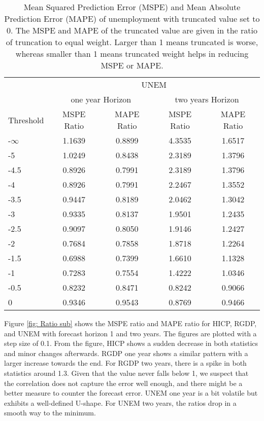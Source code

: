 \documentclass[11pt]{article}
\begin{document}
\begin{table}[!h] 
	\centering
	\caption{Mean Squared Prediction Error (MSPE) and Mean Absolute Prediction Error (MAPE) of unemployment with  truncated value set to 0. The MSPE and MAPE of the truncated value are given in the ratio of truncation to equal weight. Larger than 1 means truncated is worse, whereas smaller than 1 means truncated weight helps in reducing MSPE or MAPE.}
	\label{tab: MSPE UNEM}
	\begin{tabular}{lcccc}
		\hline\hline
		& \multicolumn{4}{c}{UNEM}                                                \\
		\cmidrule(lr){2-5}
		& \multicolumn{2}{c}{one year Horizon} & \multicolumn{2}{c}{two years Horizon} \\
		\cmidrule(lr){2-3} \cmidrule(lr){4-5}
		Threshold & MSPE Ratio &    MAPE Ratio    & MSPE Ratio &    MAPE Ratio    \\ 
		\hline
		-$\infty$ & 1.1639 & 0.8899 & 4.3535 & 1.6517\\ 
		-5 & 1.0249 & 0.8438 & 2.3189 & 1.3796\\ 
		-4.5 & 0.8926 & 0.7991 & 2.3189 & 1.3796\\ 
		-4 & 0.8926 & 0.7991 & 2.2467 & 1.3552\\ 
		-3.5 & 0.9447 & 0.8189 & 2.0462 & 1.3042\\ 
		-3 & 0.9335 & 0.8137 & 1.9501 & 1.2435\\ 
		-2.5 & 0.9097 & 0.8050 & 1.9146 & 1.2427\\ 
		-2 & 0.7684 & 0.7858 & 1.8718 & 1.2264\\ 
		-1.5 & 0.6988 & 0.7399 & 1.6610 & 1.1328\\ 
		-1 & 0.7283 & 0.7554 & 1.4222 & 1.0346\\ 
		-0.5 & 0.8232 & 0.8471 & 0.8242 & 0.9066\\ 
		0 & 0.9346 & 0.9543 & 0.8769 & 0.9466\\ \hline\hline
	\end{tabular}
\end{table}


Figure \ref{fig: Ratio sub} shows the MSPE ratio and MAPE ratio for HICP, RGDP, and UNEM with forecast horizon 1 and two years. The figures are plotted with a step size of 0.1. From the figure, HICP shows a sudden decrease in both statistics and minor changes afterwards. RGDP one year shows a similar pattern with a larger increase towards the end. For RGDP two years, there is a spike in both statistics around 1.3. Given that the value never falls below 1, we suspect that the correlation does not capture the error well enough, and there might be a better measure to counter the forecast error. UNEM one year is a bit volatile but exhibits a well-defined U-shape. For UNEM two years, the ratios drop in a smooth way to the minimum.
\end{document}

